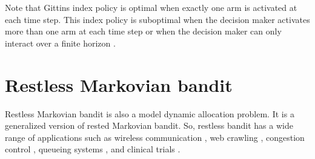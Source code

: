 Note that Gittins index policy is optimal when exactly one arm is activated at each time step.
This index policy is suboptimal when the decision maker activates more than one arm at each time step or when the decision maker can only interact over a finite horizon \cite{gittins2011multi}.



\section{Restless Markovian bandit}
\label{sec:restless_mab_pb}

Restless Markovian bandit is also a model dynamic allocation problem.
It is a generalized version of rested Markovian bandit.
So, restless bandit has a wide range of applications such as wireless communication \cite{aalto2019whittle, liu2010indexability}, web crawling \cite{avrachenkov2022whittle, nino2014dynamic}, congestion control \cite{avrachenkov2013congestion, avrachenkov2018impulsive}, queueing systems \cite{scully2018soap, aalto2011properties,aalto2009gittins,borkar2017whittle}, and clinical trials \cite{villar2015multi}.


